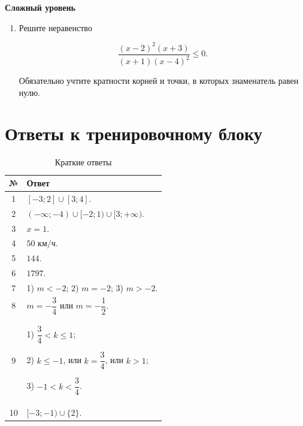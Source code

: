 \documentclass[a4paper,12pt]{article}
\begin{document}
\textbf{Сложный уровень}

\begin{enumerate}[label=\textbf{\arabic*.},start=10]

\item
Решите неравенство

\[
\frac{(x-2)^2(x+3)}
     {(x+1)(x-4)^2}
\le0.
\]

Обязательно учтите кратности корней
и точки, в которых знаменатель равен нулю.

\end{enumerate}


\newpage

\section*{\textcolor{darkaccent}{
Ответы к тренировочному блоку
}}

\begin{table}[h]
\centering
\caption{Краткие ответы}

\begin{tabularx}{\linewidth}{@{}cX@{}}

\toprule
№ & Ответ \\
\midrule

1 &
\(
[-3;2]\cup[3;4]
\).
\\

2 &
\(
(-\infty;-4)
\cup[-2;1)
\cup[3;+\infty)
\).
\\

3 &
\(
x=1
\).
\\

4 &
\(50\) км/ч.
\\

5 &
\(144\).
\\

6 &
\(1797\).
\\

7 &
1) \(m<-2\);
2) \(m=-2\);
3) \(m>-2\).
\\

8 &
\(
m=-\dfrac34
\)
или
\(
m=-\dfrac12
\).
\\

9 &
1)
\(
\dfrac34<k\le1
\);

2)
\(
k\le-1
\),
или
\(
k=\dfrac34
\),
или
\(
k>1
\);

3)
\(
-1<k<\dfrac34
\).
\\

10 &
\(
[-3;-1)\cup\{2\}
\).
\\

\bottomrule

\end{tabularx}
\end{table}
\end{document}
